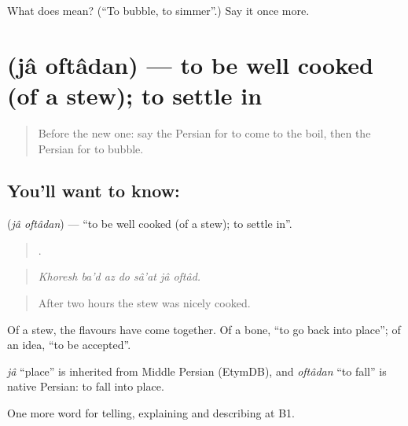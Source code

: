 \begin{tcolorbox}[breakable,colback=teal!4,colframe=teal!35!black,title={Before you move on}]
What does   mean? (\textquotedblleft{}To bubble, to simmer\textquotedblright{}.) Say it once more.
\end{tcolorbox}
\section[\texorpdfstring{\fa{جا} \fa{افتادن} (jâ oftâdan)}{جا افتادن (jâ oftâdan)}]{  (jâ oftâdan) — to be well cooked (of a stew); to settle in}

\label{lesson:FA-C358-ja-oftadan}



\begin{quote}
Before the new one: say the Persian for to come to the boil, then the Persian for to bubble.
\end{quote}

\subsection*{You'll want to know:  }
\textbf{ } (\emph{jâ oftâdan}) — \textquotedblleft{}to be well cooked (of a stew); to settle in\textquotedblright{}.

\begin{quote}
      .
\end{quote}

\begin{quote}
\emph{Khoresh ba'd az do sâ'at jâ oftâd.}
\end{quote}

\begin{quote}
After two hours the stew was nicely cooked.
\end{quote}

Of a stew, the flavours have come together. Of a bone, \textquotedblleft{}to go back into place\textquotedblright{}; of an idea, \textquotedblleft{}to be accepted\textquotedblright{}.

\begin{cousinweb}
\emph{jâ} \textquotedblleft{}place\textquotedblright{} is inherited from Middle Persian (EtymDB), and \emph{oftâdan} \textquotedblleft{}to fall\textquotedblright{} is native Persian: to fall into place.
\end{cousinweb}

\begin{grammarlens}[title={What you've built}]
One more word for telling, explaining and describing at B1.
\end{grammarlens}

